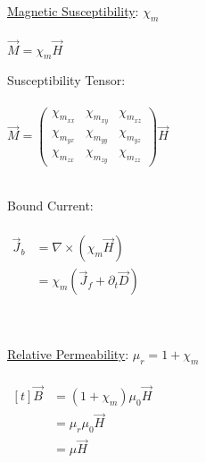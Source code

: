 \documentclass[12pt]{article}
\begin{document}
\begin{minipage}[t]{0.48\textwidth}
	\setlength{\parindent}{.5cm}
	
	\noindent \underline{Magnetic Susceptibility}: \( \chi_m \) \\ \\
	\indent \indent \( \vec{ M } = \chi_m \vec{H} \)

	\hfill \break
	Susceptibility Tensor: \\ \\
	\indent \indent \( \vec{ M } =
		\begin{pmatrix}
			\chi_{m_{xx}} & \chi_{m_{xy}} & \chi_{m_{xz}} \\
			\chi_{m_{yx}} & \chi_{m_{yy}} & \chi_{m_{yz}} \\
			\chi_{m_{zx}} & \chi_{m_{zy}} & \chi_{m_{zz}}
		\end{pmatrix}
		\vec{H} \)

	\hfill \break \\
	Bound Current: \\ \\
	\indent \indent \( \begin{aligned}
		\vec{J}_b &= \nabla \times \left( \chi_m \vec{H} \right) \\
		&= \chi_m \left( \vec{J}_f + \partial_t \vec{D} \right) 
	\end{aligned} \)

	\hfill \break \\ \\
	\underline{Relative Permeability}: \( \mu_r = 1 + \chi_m \)\\ \\
	\indent \indent \( \begin{aligned}[t]
			\vec{B} &= ( 1 + \chi_m ) \mu_0 \vec{H} \\ 
			&= \mu_r \mu_0 \vec{H}\\
			&= \mu \vec{H}
	\end{aligned} \)
\end{minipage}

\newpage
\end{document}
